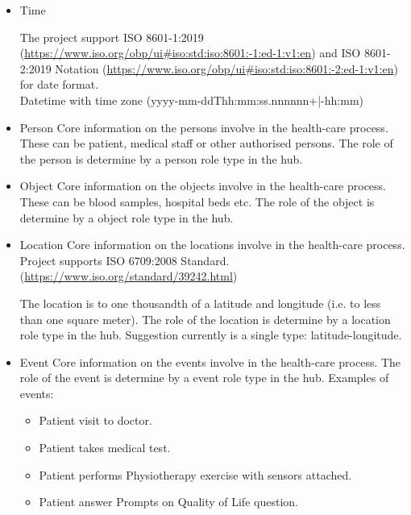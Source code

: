 \begin{itemize}
    \item Time
    
    The project support ISO 8601-1:2019 (\url{https://www.iso.org/obp/ui#iso:std:iso:8601:-1:ed-1:v1:en})
    and ISO 8601-2:2019 Notation 
    (\url{https://www.iso.org/obp/ui#iso:std:iso:8601:-2:ed-1:v1:en})
    for date format. \\
    Datetime with time zone (yyyy-mm-ddThh:mm:ss.nnnnnn+|-hh:mm)
    
    
    \item Person
    Core information on the persons involve in the health-care process.
    These can be patient, medical staff or other authorised persons.
    The role of the person is determine by a person role type in the hub.
    
    \item Object
    Core information on the objects involve in the health-care process.
    These can be blood samples, hospital beds etc.
    The role of the object is determine by a object role type in the hub.
    
    \item Location
    Core information on the locations involve in the health-care process.
    Project supports ISO 6709:2008 Standard. (\url{https://www.iso.org/standard/39242.html})
    
    
    The location is to one thousandth of a latitude and longitude (i.e. to less than one square meter).
    The role of the location is determine by a location role type in the hub.
    Suggestion currently is a single type: latitude-longitude.
    
    \item Event
    Core information on the events involve in the health-care process.
    The role of the event is determine by a event role type in the hub.
    Examples of events:
    \begin{itemize}
        \item Patient visit to doctor.
        \item Patient takes medical test.
        \item Patient performs Physiotherapy exercise with sensors attached.
        \item Patient answer Prompts on Quality of Life question.
    \end{itemize}
    
    
\end{itemize}

